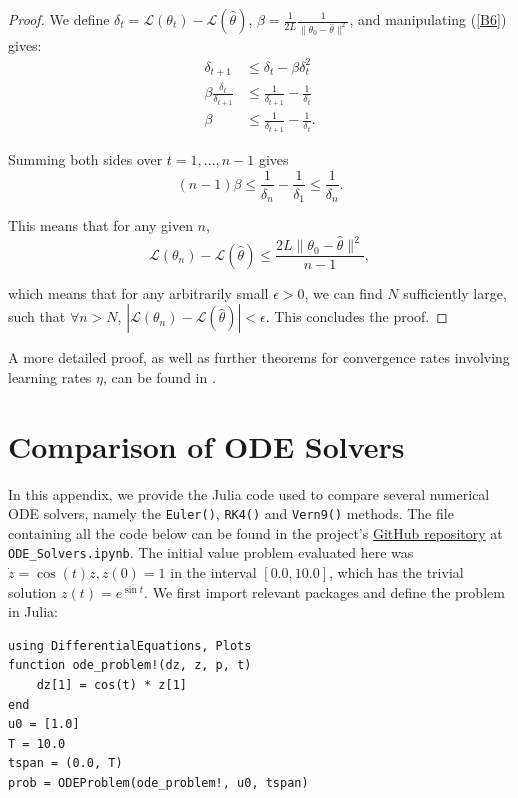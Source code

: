 \documentclass[a4paper,11pt,titlepage]{article}
\theoremstyle{definition}
\theoremstyle{plain}
\theoremstyle{remark}
\begin{document}
\begin{proof}
    We define $\delta_t = \mathcal{L}(\theta_{t}) - \mathcal{L}(\hat{\theta})$, $\beta = \frac{1}{2L} \frac{1}{\| \theta_0 - \hat{\theta} \|^2}$, and manipulating (\ref{B6}) gives:
    \begin{align*}
        \delta_{t+1} &\leq \delta_t - \beta \delta_t^2 \\
        \beta \frac{\delta_t}{\delta_{t+1}} &\leq \frac{1}{\delta_{t+1}} - \frac{1}{\delta_{t}} \\
        \beta &\leq \frac{1}{\delta_{t+1}} - \frac{1}{\delta_{t}}.
    \end{align*}
    
    Summing both sides over $t = 1, \dots, n - 1$ gives 
    $$
    (n-1)\beta \leq \frac{1}{\delta_n} - \frac{1}{\delta_1} \leq \frac{1}{\delta_n}.
    $$
    
    This means that for any given $n$,
    \begin{equation}
        \mathcal{L}(\theta_n) - \mathcal{L}(\hat{\theta}) \leq \frac{2L\|\theta_0 - \hat{\theta}\|^2}{n-1},
    \end{equation}
    
    which means that for any arbitrarily small $\epsilon > 0$, we can find $N$ sufficiently large, such that $\forall n > N$, $|\mathcal{L}(\theta_n) - \mathcal{L}(\hat{\theta})| < \epsilon$. This concludes the proof.
\end{proof}

A more detailed proof, as well as further theorems for convergence rates involving learning rates $\eta$, can be found in \cite{gower2015}.

\pagebreak
\section{Comparison of ODE Solvers}
\label{sec:odesolvecode}

In this appendix, we provide the Julia code used to compare several numerical ODE solvers, namely the \texttt{Euler()}, \texttt{RK4()} and \texttt{Vern9()} methods. The file containing all the code below can be found in the project's \href{https://github.com/jaamestaay/M2R-Group-29}{GitHub repository} at \verb|ODE_Solvers.ipynb|. The initial value problem evaluated here was $\dot{z} = \cos(t)z, z(0) = 1$ in the interval $[0.0, 10.0]$, which has the trivial solution $z(t) = e^{\sin t}$. We first import relevant packages and define the problem in Julia:
\begin{verbatim}
using DifferentialEquations, Plots
function ode_problem!(dz, z, p, t)
    dz[1] = cos(t) * z[1]
end
u0 = [1.0]
T = 10.0
tspan = (0.0, T)
prob = ODEProblem(ode_problem!, u0, tspan)
\end{verbatim}
\end{document}
